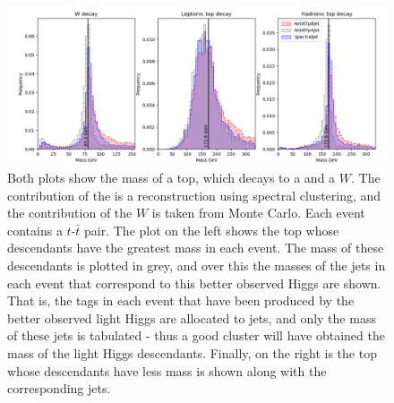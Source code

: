 \begin{figure}[htp]
    \includegraphics[width=1.\textwidth]{graphics/mass_peaks/top_long_correct_frequency.png}
    \caption{
        Both plots show the mass of a top, which decays to a  and a $W$.
        The contribution of the  is a reconstruction using spectral clustering,
        and the contribution of the $W$ is taken from Monte Carlo.
        Each event contains a \(t\)-\(\bar{t}\) pair.
        The plot on the left shows the top whose descendants have the greatest mass in each event.
        The mass of these descendants is plotted in grey, and over this
        the masses of the jets in each event that correspond to this better observed Higgs
        are shown.
        That is, the tags in each event that have been produced by the better observed light Higgs
        are allocated to jets, and only the mass of these jets is tabulated - thus
        a good cluster will have obtained the mass of the light Higgs descendants.
        Finally, on the right is the top whose descendants have less mass is shown along with
        the corresponding jets.
    }
\end{figure}    

%



